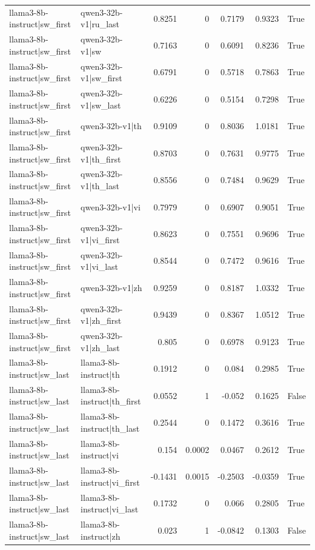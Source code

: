 \begin{table}
\begin{tabular}{l l r r r r l}
llama3-8b-instruct|sw_first & qwen3-32b-v1|ru_last & 0.8251 & 0 & 0.7179 & 0.9323 & True \\
llama3-8b-instruct|sw_first & qwen3-32b-v1|sw & 0.7163 & 0 & 0.6091 & 0.8236 & True \\
llama3-8b-instruct|sw_first & qwen3-32b-v1|sw_first & 0.6791 & 0 & 0.5718 & 0.7863 & True \\
llama3-8b-instruct|sw_first & qwen3-32b-v1|sw_last & 0.6226 & 0 & 0.5154 & 0.7298 & True \\
llama3-8b-instruct|sw_first & qwen3-32b-v1|th & 0.9109 & 0 & 0.8036 & 1.0181 & True \\
llama3-8b-instruct|sw_first & qwen3-32b-v1|th_first & 0.8703 & 0 & 0.7631 & 0.9775 & True \\
llama3-8b-instruct|sw_first & qwen3-32b-v1|th_last & 0.8556 & 0 & 0.7484 & 0.9629 & True \\
llama3-8b-instruct|sw_first & qwen3-32b-v1|vi & 0.7979 & 0 & 0.6907 & 0.9051 & True \\
llama3-8b-instruct|sw_first & qwen3-32b-v1|vi_first & 0.8623 & 0 & 0.7551 & 0.9696 & True \\
llama3-8b-instruct|sw_first & qwen3-32b-v1|vi_last & 0.8544 & 0 & 0.7472 & 0.9616 & True \\
llama3-8b-instruct|sw_first & qwen3-32b-v1|zh & 0.9259 & 0 & 0.8187 & 1.0332 & True \\
llama3-8b-instruct|sw_first & qwen3-32b-v1|zh_first & 0.9439 & 0 & 0.8367 & 1.0512 & True \\
llama3-8b-instruct|sw_first & qwen3-32b-v1|zh_last & 0.805 & 0 & 0.6978 & 0.9123 & True \\
llama3-8b-instruct|sw_last & llama3-8b-instruct|th & 0.1912 & 0 & 0.084 & 0.2985 & True \\
llama3-8b-instruct|sw_last & llama3-8b-instruct|th_first & 0.0552 & 1 & -0.052 & 0.1625 & False \\
llama3-8b-instruct|sw_last & llama3-8b-instruct|th_last & 0.2544 & 0 & 0.1472 & 0.3616 & True \\
llama3-8b-instruct|sw_last & llama3-8b-instruct|vi & 0.154 & 0.0002 & 0.0467 & 0.2612 & True \\
llama3-8b-instruct|sw_last & llama3-8b-instruct|vi_first & -0.1431 & 0.0015 & -0.2503 & -0.0359 & True \\
llama3-8b-instruct|sw_last & llama3-8b-instruct|vi_last & 0.1732 & 0 & 0.066 & 0.2805 & True \\
llama3-8b-instruct|sw_last & llama3-8b-instruct|zh & 0.023 & 1 & -0.0842 & 0.1303 & False \\

\end{tabular}
\end{table}
